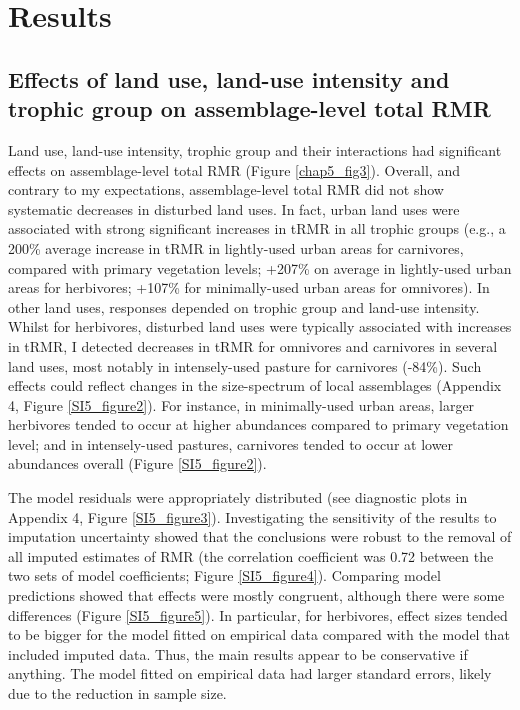 \section{Results}

\subsection{Effects of land use, land-use intensity and trophic group on assemblage-level total RMR}

Land use, land-use intensity, trophic group and their interactions had significant effects on assemblage-level total RMR (Figure \ref{chap5_fig3}). Overall, and contrary to my expectations, assemblage-level total RMR did not show systematic decreases in disturbed land uses. In fact, urban land uses were associated with strong significant increases in tRMR in all trophic groups (e.g., a 200\% average increase in tRMR in lightly-used urban areas for carnivores, compared with primary vegetation levels; +207\% on average in lightly-used urban areas for herbivores; +107\% for minimally-used urban areas for omnivores). In other land uses, responses depended on trophic group and land-use intensity. Whilst for herbivores, disturbed land uses were typically associated with increases in tRMR, I detected decreases in tRMR for omnivores and carnivores in several land uses, most notably in intensely-used pasture for carnivores (-84\%). Such effects could reflect changes in the size-spectrum of local assemblages (Appendix 4, Figure \ref{SI5_figure2}). For instance, in minimally-used urban areas, larger herbivores tended to occur at higher abundances compared to primary vegetation level; and in intensely-used pastures, carnivores tended to occur at lower abundances overall (Figure \ref{SI5_figure2}).

\vspace{0.5cm}
The model residuals were appropriately distributed (see diagnostic plots in Appendix 4, Figure \ref{SI5_figure3}). Investigating the sensitivity of the results to imputation uncertainty showed that the conclusions were robust to the removal of all imputed estimates of RMR (the correlation coefficient was 0.72 between the two sets of model coefficients; Figure \ref{SI5_figure4}). Comparing model predictions showed that effects were mostly congruent, although there were some differences (Figure \ref{SI5_figure5}). In particular, for herbivores, effect sizes tended to be bigger for the model fitted on empirical data compared with the model that included imputed data. Thus, the main results appear to be conservative if anything. The model fitted on empirical data had larger standard errors, likely due to the reduction in sample size. 


